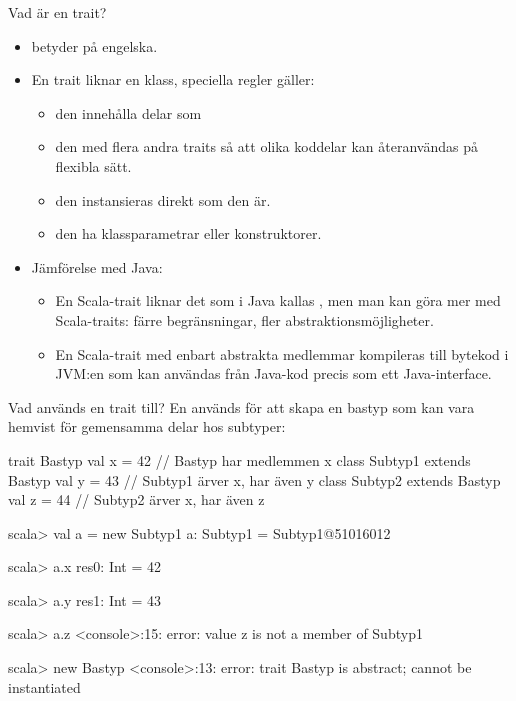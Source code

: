 \begin{Slide}{Vad är en trait?}
\begin{itemize}
\item {} betyder  på engelska.

\item En trait liknar en klass,  speciella regler gäller:  

\begin{itemize}

\item den  innehålla delar som 

\item den  med flera andra traits så att olika koddelar kan återanvändas på flexibla sätt. 

\item den  instansieras direkt som den är.

\item den  ha klassparametrar eller konstruktorer.
\end{itemize}

\pause
\item {\SlideFontSmall Jämförelse med Java:} 
\begin{itemize}\SlideFontTiny
\item En Scala-trait liknar det som i Java kallas , men man kan göra mer med Scala-traits: färre begränsningar, fler abstraktionsmöjligheter.

\item En Scala-trait med enbart abstrakta medlemmar kompileras till bytekod i JVM:en som kan användas från Java-kod precis som ett Java-interface.
\end{itemize}
\end{itemize}

\end{Slide}

\begin{Slide}{Vad används en trait till?}
En  används för att skapa en bastyp som kan vara hemvist för gemensamma delar hos subtyper:
\begin{Code}
trait Bastyp { val x = 42 }                 // Bastyp har medlemmen x
class Subtyp1 extends Bastyp { val y = 43 } // Subtyp1 ärver x, har även y
class Subtyp2 extends Bastyp { val z = 44 } // Subtyp2 ärver x, har även z
\end{Code}
\pause\vspace{-0.5em}
\begin{REPL}
scala> val a = new Subtyp1
a: Subtyp1 = Subtyp1@51016012

scala> a.x
res0: Int = 42

scala> a.y
res1: Int = 43

scala> a.z
<console>:15: error: value z is not a member of Subtyp1

scala> new Bastyp
<console>:13: error: trait Bastyp is abstract; cannot be instantiated
\end{REPL}

\end{Slide}


